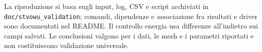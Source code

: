 \documentclass[10pt,a4paper]{article}
\begin{document}
{\sloppy La riproduzione si basa sugli input, log, CSV e script archiviati in \texttt{doc/stvowu\_validation}; comandi, dipendenze e associazione fra risultati e driver sono documentati nel README. Il controllo energia usa differenze all'indietro sui campi salvati. Le conclusioni valgono per i dati, le mesh e i parametri riportati e non costituiscono validazione universale.\par}
\end{document}
